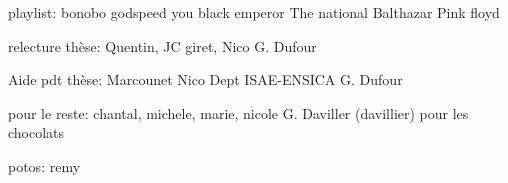 
playlist:
bonobo
godspeed you black emperor
The national
Balthazar
Pink floyd

relecture thèse:
Quentin,
JC giret,
Nico
G. Dufour

Aide pdt thèse:
Marcounet
Nico
Dept ISAE-ENSICA
G. Dufour

pour le reste:
chantal, michele, marie, nicole
G. Daviller (davillier) pour les chocolats

potos:
remy